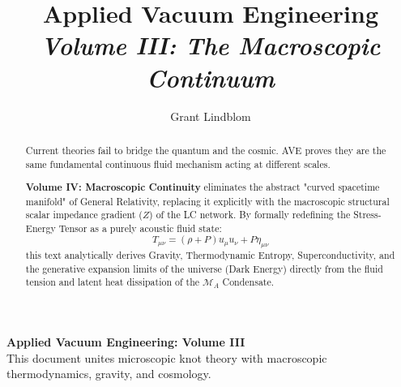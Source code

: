 \title{\textbf{Applied Vacuum Engineering} \\ \large \textit{Volume III: The Macroscopic Continuum}}
\author{Grant Lindblom}
\date{}

\maketitle

\vfill
\noindent\textbf{Applied Vacuum Engineering: Volume III} \\
This document unites microscopic knot theory with macroscopic thermodynamics, gravity, and cosmology.

\begin{abstract}
    Current theories fail to bridge the quantum and the cosmic. AVE proves they are the same fundamental continuous fluid mechanism acting at different scales.
    
    \textbf{Volume IV: Macroscopic Continuity} eliminates the abstract "curved spacetime manifold" of General Relativity, replacing it explicitly with the macroscopic structural scalar impedance gradient ($Z$) of the LC network. By formally redefining the Stress-Energy Tensor as a purely acoustic fluid state:
    \begin{equation}
        T_{\mu\nu} = (\rho + P)u_\mu u_\nu + P \eta_{\mu\nu}
    \end{equation}
    this text analytically derives Gravity, Thermodynamic Entropy, Superconductivity, and the generative expansion limits of the universe (Dark Energy) directly from the fluid tension and latent heat dissipation of the $\mathcal{M}_A$ Condensate.
\end{abstract}
